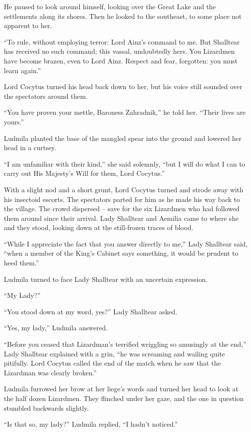  

He paused to look around himself, looking over the Great Lake and the settlements along its shores. Then he looked to the southeast, to some place not apparent to her.

 

“To rule, without employing terror: Lord Ainz’s command to me. But Shalltear has received no such command; this vassal, undoubtedly hers. You Lizardmen have become brazen, even to Lord Ainz. Respect and fear, forgotten: you must learn again.”

 

Lord Cocytus turned his head back down to her, but his voice still sounded over the spectators around them.

 

“You have proven your mettle, Baroness Zahradnik,” he told her. “Their lives are yours.”

 

Ludmila planted the base of the mangled spear into the ground and lowered her head in a curtsey.

 

“I am unfamiliar with their kind,” she said solemnly, “but I will do what I can to carry out His Majesty’s Will for them, Lord Cocytus.”

 

With a slight nod and a short grunt, Lord Cocytus turned and strode away with his insectoid escorts. The spectators parted for him as he made his way back to the village. The crowd dispersed – save for the six Lizardmen who had followed them around since their arrival. Lady Shalltear and Aemilia came to where she and they stood, looking down at the still-frozen traces of blood.

 

“While I appreciate the fact that you answer directly to me,” Lady Shalltear said, “when a member of the King’s Cabinet says something, it would be prudent to heed them.”

 

Ludmila turned to face Lady Shalltear with an uncertain expression.

 

“My Lady?”

 

“You stood down at my word, yes?” Lady Shalltear asked.

 

“Yes, my lady,” Ludmila answered.

 

“Before you ceased that Lizardman’s terrified wriggling so amusingly at the end,” Lady Shalltear explained with a grin, “he was screaming and wailing quite pitifully. Lord Cocytus called the end of the match when he saw that the Lizardman was clearly broken.”

 

Ludmila furrowed her brow at her liege’s words and turned her head to look at the half dozen Lizardmen. They flinched under her gaze, and the one in question stumbled backwards slightly.

 

“Is that so, my lady?” Ludmila replied, “I hadn’t noticed.”

